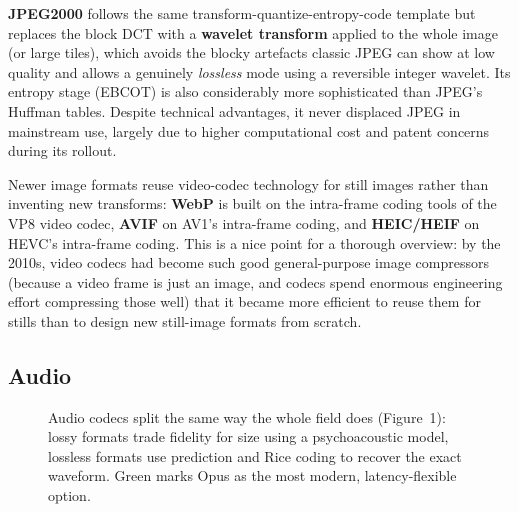 \documentclass[11pt]{article}
\begin{document}
\textbf{JPEG2000} follows the same transform-quantize-entropy-code template but replaces the block DCT with a \textbf{wavelet transform} applied to the whole image (or large tiles), which avoids the blocky artefacts classic JPEG can show at low quality and allows a genuinely \emph{lossless} mode using a reversible integer wavelet. Its entropy stage (EBCOT) is also considerably more sophisticated than JPEG's Huffman tables. Despite technical advantages, it never displaced JPEG in mainstream use, largely due to higher computational cost and patent concerns during its rollout.

Newer image formats reuse video-codec technology for still images rather than inventing new transforms: \textbf{WebP} is built on the intra-frame coding tools of the VP8 video codec, \textbf{AVIF} on AV1's intra-frame coding, and \textbf{HEIC/HEIF} on HEVC's intra-frame coding. This is a nice point for a thorough overview: by the 2010s, video codecs had become such good general-purpose image compressors (because a video frame is just an image, and codecs spend enormous engineering effort compressing those well) that it became more efficient to reuse them for stills than to design new still-image formats from scratch.

\subsection{Audio}

\begin{figure}[h]
\centering
{}
\caption{Audio codecs split the same way the whole field does (Figure~1): lossy formats trade fidelity for size using a psychoacoustic model, lossless formats use prediction and Rice coding to recover the exact waveform. Green marks Opus as the most modern, latency-flexible option.}
\end{figure}
\end{document}
